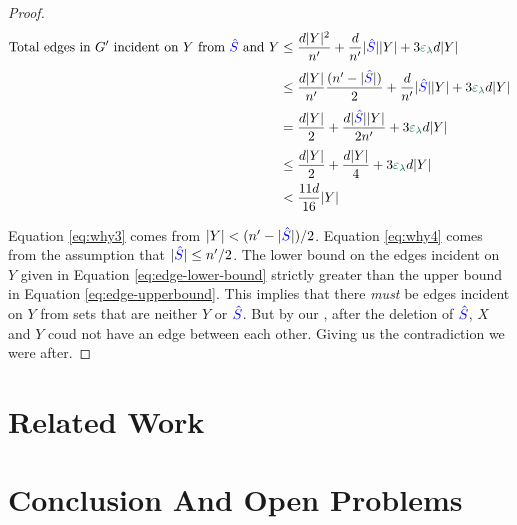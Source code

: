 \documentclass[11pt]{article}
\begin{document}
\begin{proof}
\begin{align}
 \text{Total edges in $\RemGraph$ incident on $Y$ from $\BadSet$ and $Y$} &\leq \frac{d\Size{Y}^2}{\SizeRemGraph} +   \frac{d}{\SizeRemGraph}\Size{\BadSet}\Size{Y} + 3\epsilonL d\Size{Y}\\[3pt]                                                                          &\leq  \frac{d\Size{Y}}{\SizeRemGraph}\frac{(\SizeRemGraph - \Size{\BadSet})}{2} + \frac{d}{\SizeRemGraph}\Size{\BadSet}\Size{Y} + 3\epsilonL d\Size{Y} \label{eq:why3}\\[3pt]
                                                                          &= \frac{d\Size{Y}}{2} + \frac{d\Size{\BadSet}\Size{Y}}{2\SizeRemGraph} +3\epsilonL d\Size{Y}\\[3pt]
                                                                          &\leq \frac{d\Size{Y}}{2} + \frac{d\Size{Y}}{4} +3\epsilonL d\Size{Y}  \label{eq:why4}\\
                                                                            &< \frac{11d}{16}\Size{Y} \label{eq:edge-upperbound}
\end{align}

Equation \eqref{eq:why3} comes from  $|Y| < (n' - |\textcolor{blue}{\hat{S}}|)/2$.
Equation \eqref{eq:why4} comes from the assumption that $|\textcolor{blue}{\hat{S}}| \leq n'/2$.
The lower bound on the edges incident on $Y$ given in Equation \eqref{eq:edge-lower-bound} strictly greater than the upper bound in Equation \eqref{eq:edge-upperbound}.
This implies that there \emph{must} be edges incident on $Y$ from sets that are neither $Y$ or $\textcolor{blue}{\hat{S}}$.
But by our , after the deletion of $\textcolor{blue}{\hat{S}}$, $X$ and $Y$ coud not have an edge between each other.
Giving us the contradiction we were after.

\end{proof}

\section{Related Work}
\label{sec:related-work}

\section{Conclusion And Open Problems}
\label{sec:conclusion}



\clearpage
\appendix
\end{document}
